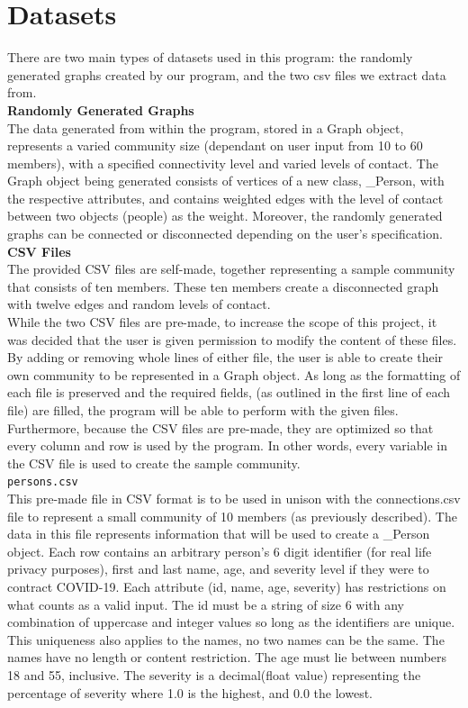 \documentclass[fontsize=11pt]{article}
\newcommand{\ttt}[1]{\texttt{#1}}
\begin{document}
\section*{Datasets}
There are two main types of datasets used in this program: the randomly generated graphs created by our program, and the two csv files we extract data from.\\
\newline
\textbf{Randomly Generated Graphs}\\
\newline
The data generated from within the program, stored in a Graph object, represents a varied community size (dependant on user input from 10 to 60 members), with a specified connectivity level and varied levels of contact. The Graph object being generated consists of vertices of a new class, \_Person, with the respective attributes, and contains weighted edges with the level of contact between two objects (people) as the weight. Moreover, the randomly generated graphs can be connected or disconnected depending on the user's specification.\\
\newline
\textbf{CSV Files}\\
The provided CSV files are self-made, together representing a sample community that consists of ten members. These ten members create a disconnected graph with twelve edges and random levels of contact.\\
\newline
While the two CSV files are pre-made, to increase the scope of this project, it was decided that the user is given permission to modify the content of these files. By adding or removing whole lines of either file, the user is able to create their own community to be represented in a Graph object. As long as the formatting of each file is preserved and the required fields, (as outlined in the first line of each file) are filled, the program will be able to perform with the given files. Furthermore, because the CSV files are pre-made, they are optimized so that every column and row is used by the program. In other words, every variable in the CSV file is used to create the sample community.\\
\newline
\ttt{persons.csv} \\
This pre-made file in CSV format is to be used in unison with the connections.csv file to represent a small community of 10 members (as previously described). The data in this file represents information that will be used to create a \_Person object. Each row contains an arbitrary person's 6 digit identifier (for real life privacy purposes), first and last name, age, and severity level if they were to contract COVID-19. Each attribute (id, name, age, severity) has restrictions on what counts as a valid input. The id must be a string of size 6 with any combination of uppercase and integer values so long as the identifiers are unique. This uniqueness also applies to the names, no two names can be the same. The names have no length or content restriction. The age must lie between numbers 18 and 55, inclusive. The severity is a decimal(float value) representing the percentage of severity where 1.0 is the highest, and 0.0 the lowest.\\
\end{document}
